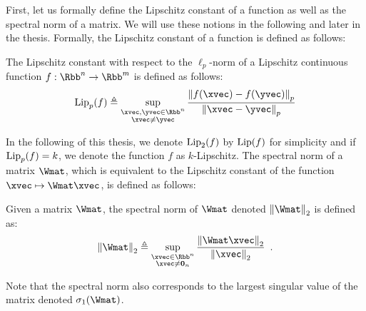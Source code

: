 First, let us formally define the Lipschitz constant of a function as well as the spectral norm of a matrix.
We will use these notions in the following and later in the thesis.
Formally, the Lipschitz constant of a function is defined as follows: 
\begin{definition} \label{definition:ch2-lipschitz_constant}
  The Lipschitz constant with respect to the $\ell_p$-norm of a Lipschitz continuous function $f: \Rbb^n \rightarrow \Rbb^m$ is defined as follows:
  \begin{equation}
  \lipp{p}{f} \triangleq \sup_{\substack{\xvec, \yvec \in \Rbb^n \\ \xvec \neq \yvec}} \frac{\norm{f(\xvec) - f(\yvec)}_p}{\norm{\xvec - \yvec}_p}
  \end{equation}
  \removespace
\end{definition}
\noindent
In the following of this thesis, we denote $\lipp{2}{f}$ by $\lip{f}$ for simplicity and if $\lipp{p}{f}=k$, we denote the function $f$ as $k$-Lipschitz.
The spectral norm of a matrix $\Wmat$, which is equivalent to the Lipschitz constant of the function $\xvec \mapsto \Wmat \xvec$, is defined as follows:
\begin{definition} \label{defintion:ch2-spectral_norm}
Given a matrix $\Wmat$, the spectral norm of $\Wmat$ denoted $\norm{\Wmat}_2$ is defined as:
  \begin{equation}
    \norm{\Wmat}_2 \triangleq \sup_{\substack{\xvec \in \Rbb^n \\ \xvec \neq \zerovec{n}}} \frac{\norm{\Wmat \xvec}_2}{\norm{\xvec}_2} \enspace.
  \end{equation}
  \removespace
\end{definition}
\noindent
Note that the spectral norm also corresponds to the largest singular value of the matrix denoted $\sigma_1(\Wmat)$.

